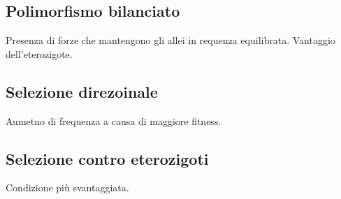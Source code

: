 	\subsection{Polimorfismo bilanciato}
	Presenza di forze che mantengono gli allei in requenza equilibrata.
	Vantaggio dell'eterozigote.

	\subsection{Selezione direzoinale}
	Aumetno di frequenza a causa di maggiore fitness.

	\subsection{Selezione contro eterozigoti}
	Condizione pi\`u svantaggiata.

